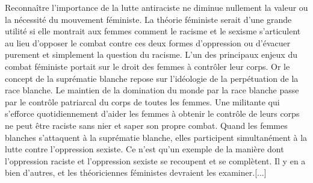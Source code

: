 
Reconnaître l'importance de la lutte antiraciste ne diminue nullement la valeur ou la nécessité du mouvement féministe. La théorie féministe serait d'une grande utilité si elle montrait aux femmes comment le racisme et le sexisme s'articulent au lieu d'opposer le combat contre ces deux formes d'oppression ou d'évacuer purement et simplement la question du racisme.
L'un des principaux enjeux du combat féministe portait sur le droit des femmes à contrôler leur corps.
Or le concept de la suprématie blanche repose sur l'idéologie de la perpétuation de la race blanche.
Le maintien de la domination du monde par la race blanche passe par le contrôle patriarcal du corps de toutes les femmes.
Une militante qui s'efforce quotidiennement d'aider les femmes à obtenir le contrôle de leurs corps ne peut être raciste sans nier et saper son propre combat.
Quand les femmes blanches s'attaquent à la suprématie blanche, elles participent simultanément à la lutte contre l'oppression sexiste.
Ce n'est qu'un exemple de la manière dont l'oppression raciste et l'oppression sexiste se recoupent et se complètent.
Il y en a bien d'autres, et les théoriciennes féministes devraient les examiner.[...]
\bigskip 

